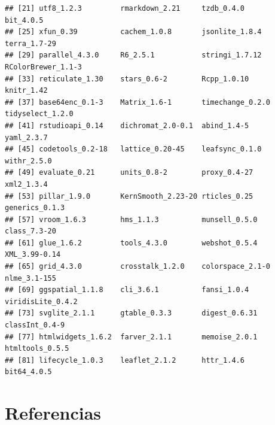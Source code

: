 \documentclass[spanish]{article}
\begin{document}
\begin{verbatim}
## [21] utf8_1.2.3         rmarkdown_2.21     tzdb_0.4.0         bit_4.0.5         
## [25] xfun_0.39          cachem_1.0.8       jsonlite_1.8.4     terra_1.7-29      
## [29] parallel_4.3.0     R6_2.5.1           stringi_1.7.12     RColorBrewer_1.1-3
## [33] reticulate_1.30    stars_0.6-2        Rcpp_1.0.10        knitr_1.42        
## [37] base64enc_0.1-3    Matrix_1.6-1       timechange_0.2.0   tidyselect_1.2.0  
## [41] rstudioapi_0.14    dichromat_2.0-0.1  abind_1.4-5        yaml_2.3.7        
## [45] codetools_0.2-18   lattice_0.20-45    leafsync_0.1.0     withr_2.5.0       
## [49] evaluate_0.21      units_0.8-2        proxy_0.4-27       xml2_1.3.4        
## [53] pillar_1.9.0       KernSmooth_2.23-20 rticles_0.25       generics_0.1.3    
## [57] vroom_1.6.3        hms_1.1.3          munsell_0.5.0      class_7.3-20      
## [61] glue_1.6.2         tools_4.3.0        webshot_0.5.4      XML_3.99-0.14     
## [65] grid_4.3.0         crosstalk_1.2.0    colorspace_2.1-0   nlme_3.1-155      
## [69] ggspatial_1.1.8    cli_3.6.1          fansi_1.0.4        viridisLite_0.4.2 
## [73] svglite_2.1.1      gtable_0.3.3       digest_0.6.31      classInt_0.4-9    
## [77] htmlwidgets_1.6.2  farver_2.1.1       memoise_2.0.1      htmltools_0.5.5   
## [81] lifecycle_1.0.3    leaflet_2.1.2      httr_1.4.6         bit64_4.0.5
\end{verbatim}

\hypertarget{referencias}{%
\section*{Referencias}\label{referencias}}
\end{document}

